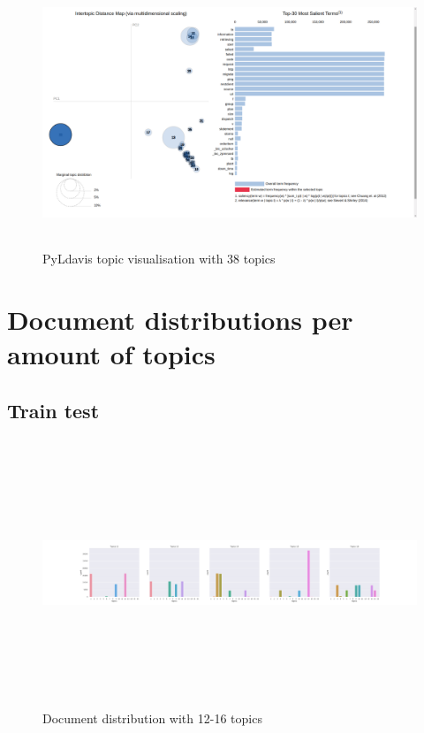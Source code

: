  \begin{figure}[!h]
    \centering
    \includegraphics[width=15cm, height=8cm,trim=0 0 100px 0, clip=true]{figures/pyldavis/pyldavis_38.png}
    \caption{PyLdavis topic visualisation with 38 topics}
    \label{fig:pyldavis_38}
\end{figure}



\FloatBarrier
\section{Document distributions per amount of topics}\label{appendices:documentdistribution}

\subsection{Train test}
\begin{figure}[h]
    \centering
    \includegraphics[width=15cm, height=8cm]{figures/doc_distr/doc_distribution_12-16.png}
    \caption{Document distribution with 12-16 topics}
    \label{fig:Doc_distr_12-16}
\end{figure}

